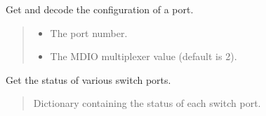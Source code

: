 \documentclass[letterpaper,10pt,english]{sphinxmanual}
\begin{document}
\begin{fulllineitems}
\label{\detokenize{cplddocs:phy_marvell_88X2222_init.get_port_cfg}}
\pysigstartsignatures
{}
\pysigstopsignatures
\sphinxAtStartPar
Get and decode the configuration of a port.
\begin{quote}\begin{description}
\begin{itemize}
\item {} 
\sphinxAtStartPar
{} \textendash{} The port number.

\item {} 
\sphinxAtStartPar
{} \textendash{} The MDIO multiplexer value (default is 2).

\end{itemize}

\end{description}\end{quote}

\end{fulllineitems}


\begin{fulllineitems}
\label{\detokenize{cplddocs:phy_marvell_88X2222_init.get_switch_status}}
\pysigstartsignatures
{}
\pysigstopsignatures
\sphinxAtStartPar
Get the status of various switch ports.
\begin{quote}\begin{description}
\sphinxAtStartPar
Dictionary containing the status of each switch port.

\end{description}\end{quote}

\end{fulllineitems}

\end{document}

